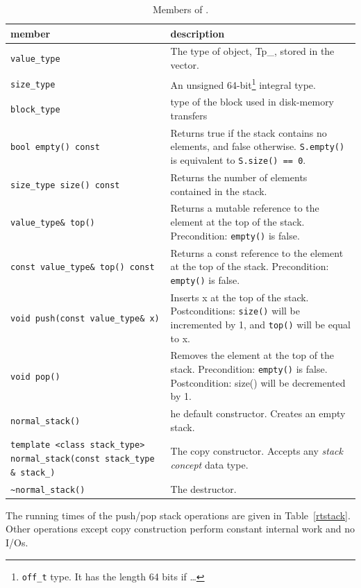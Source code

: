 \documentclass[twoside]{book}
\begin{document}
\begin{table}[h]
\begin{center}
\caption{Members of \xnormalstack.}
\label{normalstackmembers}
\begin{tabular}{|p{6cm}|p{5cm}|}
\hline
member & description  \\
\hline\hline
\texttt{value\_type} &  The type of object, Tp\_, stored in the vector. \\
\hline
\texttt{size\_type} & An unsigned 64-bit\footnote{\texttt{off\_t}
type. It has the length 64 bits if \ldots} integral type. \\  
\hline
\texttt{block\_type} & type of the block used in disk-memory 
transfers \\
\hline
\texttt{bool empty() const} &  Returns true if the stack contains no
elements, and false  otherwise. \texttt{S.empty()} is equivalent to \texttt{S.size() ==
0}. \\ 
\hline
\texttt{size\_type size() const} & Returns the number of elements
contained in the stack. \\
\hline
\texttt{value\_type\& top()} & Returns a mutable reference to the
element at the top of the stack. Precondition: \texttt{empty()} is
false. \\ 
\hline
\texttt{const value\_type\& top() const} & Returns a const reference
to the element at the top of the stack. Precondition: \texttt{empty()} is
false.\\ 
\hline
\texttt{void push(const value\_type\& x)} & Inserts x at the top of
the stack. Postconditions: \texttt{size()} will be incremented by 1,
and \texttt{top()} will be equal to x. \\
\hline
\texttt{void pop()} & Removes the element at the top of the stack.
Precondition: \texttt{empty()} is false. Postcondition: size() will be
decremented by 1. \\ 
\hline
\texttt{normal\_stack()} & he default constructor. Creates an empty
stack.\\
\hline
\texttt{template <class stack\_type>
normal\_stack(const stack\_type \& stack\_)} & The copy
constructor. Accepts any \emph{stack concept} data type.\\ 
\hline
\texttt{\textasciitilde normal\_stack()} & The destructor.\\
\hline
\end{tabular}
\end{center}
\end{table}

The running times of the push/pop
stack operations are given in Table~\ref{rtstack}. Other operations
except copy construction perform constant internal work and no I/Os.
\end{document}
